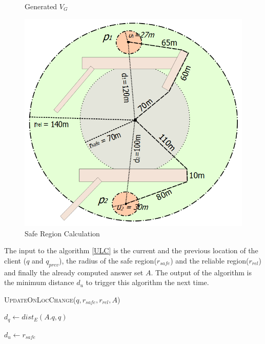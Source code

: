 \documentclass{sig-alternate}
\begin{document}
\begin{figure}[!htb]
  \caption{Generated $V_G$}\label{fig:poi_obs_path}
\endminipage\hfill
{}%
  \includegraphics[width=\linewidth]{safe_region.png}
  \caption{Safe Region Calculation}\label{fig:safe_region}
\endminipage
\end{figure}


The input to the algorithm \ref{ULC} is the current and the previous location of the client ($q$ and $q_{prev}$), the radius of the safe region($r_{safe}$) and the reliable region($r_{rel}$) and finally the already computed answer set $A$. The output of the algorithm is the minimum distance $d_u$ to trigger this algorithm the next time.

\begin{algorithm}
\caption{\textsc{UpdateOnLocChange}($q, r_{safe}, r_{rel}, A$)}
\label{ULC}

    $d_q \gets dist_E(A.q, q)$
    
    
    
    \Return $d_u \gets r_{safe}$

\end{algorithm}
\end{document}
